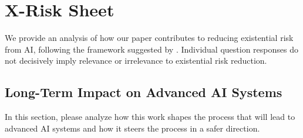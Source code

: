 \section{X-Risk Sheet}\label{app:xrisk_sheet}
We provide an analysis of how our paper contributes to reducing existential risk from AI, following the framework suggested by \citet{hendrycks2022xrisk}. Individual question responses do not decisively imply relevance or irrelevance to existential risk reduction.

\subsection{Long-Term Impact on Advanced AI Systems}
In this section, please analyze how this work shapes the process that will lead to advanced AI systems and how it steers the process in a safer direction.


